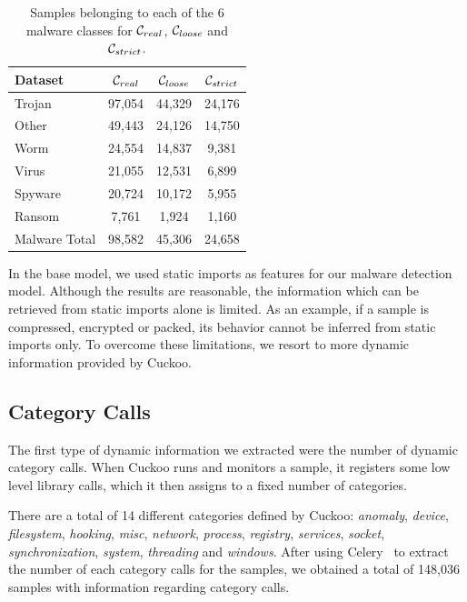 \begin{table}[!htb]
	\renewcommand{\arraystretch}{1.2} %
	\centering
	\begin{tabular}{lccc}
		Dataset			& $\mathcal{C}_{real}$ & $\mathcal{C}_{loose}$ & $\mathcal{C}_{strict}$	\\
		\hline
		Trojan			& 97,054 & 44,329 & 24,176\\
		Other			& 49,443 & 24,126 & 14,750\\
		Worm			& 24,554 & 14,837 & 9,381\\
		Virus			& 21,055 & 12,531 & 6,899\\
		Spyware			& 20,724 & 10,172 & 5,955\\
		Ransom			& 7,761 & 1,924 & 1,160\\
		\hline
		\hline
		Malware Total	& 98,582 & 45,306 & 24,658\\
		\hline
	\end{tabular}
	\medskip
	\caption{Samples belonging to each of the 6 malware classes for $\mathcal{C}_{real}$, $\mathcal{C}_{loose}$ and $\mathcal{C}_{strict}$.}
	\label{tab:dataset_sizes_new}
\end{table}

\medskip

In the base model, we used static imports as features for our malware detection model.
Although the results are reasonable, the information which can be retrieved from static imports alone is limited.
As an example, if a sample is compressed, encrypted or packed, its behavior cannot be inferred from static imports only.
To overcome these limitations, we resort to more dynamic information provided by Cuckoo.

\subsection{Category Calls}
\label{section:improvements_categories}

The first type of dynamic information we extracted were the number of dynamic category calls.
When Cuckoo runs and monitors a sample, it registers some low level library calls, which it then assigns to a fixed number of categories.

There are a total of 14 different categories defined by Cuckoo: \textit{anomaly}, \textit{device}, \textit{filesystem}, \textit{hooking}, \textit{misc}, \textit{network}, \textit{process}, \textit{registry}, \textit{services}, \textit{socket}, \textit{synchronization}, \textit{system}, \textit{threading} and \textit{windows}.
After using Celery~\cite{tool:celery} to extract the number of each category calls for the samples, we obtained a total of 148,036 samples with information regarding category calls.

